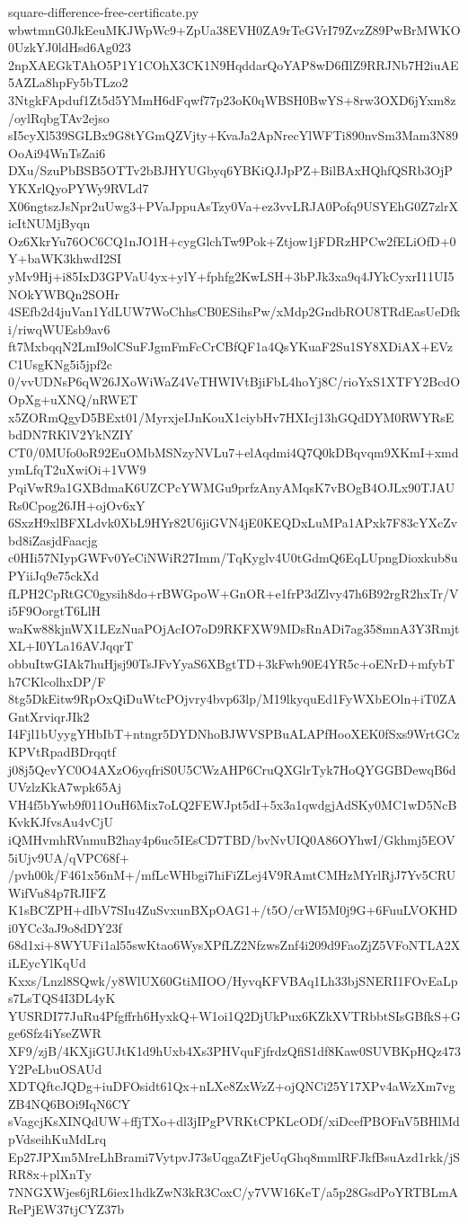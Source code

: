 \documentclass[11pt]{article}
\theoremstyle{definition}
\theoremstyle{remark}
\begin{document}
\begin{filecontents*}[overwrite]{square-difference-free-certificate.py}
wbwtmnG0JkEeuMKJWpWc9+ZpUa38EVH0ZA9rTeGVrI79ZvzZ89PwBrMWKO0UzkYJ0ldHsd6Ag023
2npXAEGkTAhO5P1Y1COhX3CK1N9HqddarQoYAP8wD6fIlZ9RRJNb7H2iuAE5AZLa8hpFy5bTLzo2
3NtgkFApduf1Zt5d5YMmH6dFqwf77p23oK0qWBSH0BwYS+8rw3OXD6jYxm8z/oylRqbgTAv2ejso
sI5cyXl539SGLBx9G8tYGmQZVjty+KvaJa2ApNrecYlWFTi890nvSm3Mam3N89OoAi94WnTsZai6
DXu/SzuPbBSB5OTTv2bBJHYUGbyq6YBKiQJJpPZ+BilBAxHQhfQSRb3OjPYKXrlQyoPYWy9RVLd7
X06ngtszJsNpr2uUwg3+PVaJppuAsTzy0Va+ez3vvLRJA0Pofq9USYEhG0Z7zlrXicItNUMjByqn
Oz6XkrYu76OC6CQ1nJO1H+cygGlchTw9Pok+Ztjow1jFDRzHPCw2fELiOfD+0Y+baWK3khwdI2SI
yMv9Hj+i85IxD3GPVaU4yx+ylY+fphfg2KwLSH+3bPJk3xa9q4JYkCyxrI11UI5NOkYWBQn2SOHr
4SEfb2d4juVan1YdLUW7WoChhsCB0ESihsPw/xMdp2GndbROU8TRdEasUeDfki/riwqWUEsb9av6
ft7MxbqqN2LmI9olCSuFJgmFmFcCrCBfQF1a4QsYKuaF2Su1SY8XDiAX+EVzC1UsgKNg5i5jpf2c
0/vvUDNsP6qW26JXoWiWaZ4VeTHWIVtBjiFbL4hoYj8C/rioYxS1XTFY2BcdOOpXg+uXNQ/nRWET
x5ZORmQgyD5BExt01/MyrxjeIJnKouX1ciybHv7HXIcj13hGQdDYM0RWYRsEbdDN7RKlV2YkNZIY
CT0/0MUfo0oR92EuOMbMSNzyNVLu7+elAqdmi4Q7Q0kDBqvqm9XKmI+xmdymLfqT2uXwiOi+1VW9
PqiVwR9a1GXBdmaK6UZCPcYWMGu9prfzAnyAMqsK7vBOgB4OJLx90TJAURs0Cpog26JH+ojOv6xY
6SxzH9xlBFXLdvk0XbL9HYr82U6jiGVN4jE0KEQDxLuMPa1APxk7F83cYXcZvbd8iZasjdFaacjg
c0HIi57NIypGWFv0YeCiNWiR27Imm/TqKyglv4U0tGdmQ6EqLUpngDioxkub8uPYiiJq9e75ckXd
fLPH2CpRtGC0gysih8do+rBWGpoW+GnOR+e1frP3dZlvy47h6B92rgR2hxTr/Vi5F9OorgtT6LlH
waKw88kjnWX1LEzNuaPOjAcIO7oD9RKFXW9MDsRnADi7ag358mnA3Y3RmjtXL+I0YLa16AVJqqrT
obbuItwGIAk7huHjsj90TsJFvYyaS6XBgtTD+3kFwh90E4YR5c+oENrD+mfybTh7CKlcolhxDP/F
8tg5DkEitw9RpOxQiDuWtcPOjvry4bvp63lp/M19lkyquEd1FyWXbEOln+iT0ZAGntXrviqrJIk2
I4Fjl1bUyygYHbIbT+ntngr5DYDNhoBJWVSPBuALAPfHooXEK0fSxs9WrtGCzKPVtRpadBDrqqtf
j08j5QevYC0O4AXzO6yqfriS0U5CWzAHP6CruQXGlrTyk7HoQYGGBDewqB6dUVzlzKkA7wpk65Aj
VH4f5bYwb9f011OuH6Mix7oLQ2FEWJpt5dI+5x3a1qwdgjAdSKy0MC1wD5NcBKvkKJfvsAu4vCjU
iQMHvmhRVnmuB2hay4p6uc5IEsCD7TBD/bvNvUIQ0A86OYhwI/Gkhmj5EOV5iUjv9UA/qVPC68f+
/pvh00k/F461x56nM+/mfLcWHbgi7hiFiZLej4V9RAmtCMHzMYrlRjJ7Yv5CRUWifVu84p7RJIFZ
K1sBCZPH+dIbV7SIu4ZuSvxunBXpOAG1+/t5O/crWI5M0j9G+6FuuLVOKHDi0YCc3aJ9o8dDY23f
68d1xi+8WYUFi1al55swKtao6WysXPfLZ2NfzwsZnf4i209d9FaoZjZ5VFoNTLA2XiLEycYlKqUd
Kxxs/Lnzl8SQwk/y8WlUX60GtiMIOO/HyvqKFVBAq1Lh33bjSNERI1FOvEaLps7LsTQS4I3DL4yK
YUSRDI77JuRu4Pfgffrh6HyxkQ+W1oi1Q2DjUkPux6KZkXVTRbbtSIsGBfkS+Gge6Sfz4iYseZWR
XF9/zjB/4KXjiGUJtK1d9hUxb4Xs3PHVquFjfrdzQfiS1df8Kaw0SUVBKpHQz473Y2PeLbuOSAUd
XDTQftcJQDg+iuDFOsidt61Qx+nLXe8ZxWzZ+ojQNCi25Y17XPv4aWzXm7vgZB4NQ6BOi9IqN6CY
sVagcjKsXINQdUW+ffjTXo+dl3jIPgPVRKtCPKLcODf/xiDcefPBOFnV5BHlMdpVdseihKuMdLrq
Ep27JPXm5MreLhBrami7VytpvJ73sUqgaZtFjeUqGhq8mmlRFJkfBsuAzd1rkk/jSRR8x+plXnTy
7NNGXWjes6jRL6iex1hdkZwN3kR3CoxC/y7VW16KeT/a5p28GsdPoYRTBLmARePjEW37tjCYZ37b

\end{filecontents*}
\end{document}
